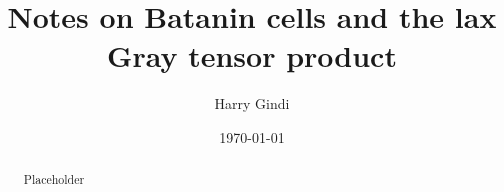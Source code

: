 \documentclass[10pt]{amsart}
\title[Lax tensor cylinders]{Notes on Batanin cells and the lax Gray tensor product}
\author[H. Gindi]{Harry Gindi}
\date{\today}
\numberwithin{equation}{section}
\theoremstyle{plain}   %
\theoremstyle{remark}
\theoremstyle{plain}
\begin{document}
\begin{abstract}
Placeholder
\end{abstract}

\maketitle





\end{document}
